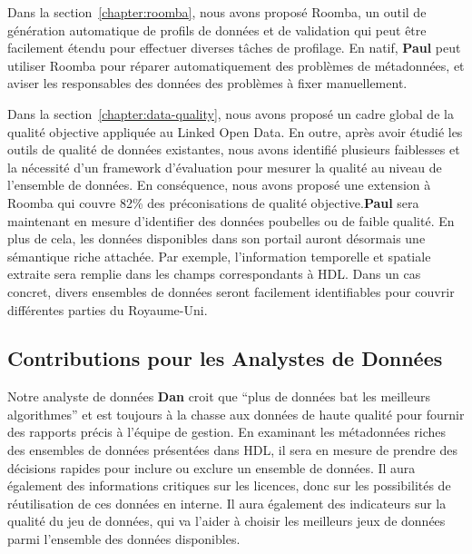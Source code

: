 Dans la section~\ref{chapter:roomba}, nous avons propos\'{e} Roomba, un outil de g\'{e}n\'{e}ration automatique de profils de donn\'{e}es et de validation qui peut \^{e}tre facilement \'{e}tendu pour effectuer diverses tâches de profilage. En natif, \textbf{Paul} peut utiliser Roomba pour r\'{e}parer automatiquement des probl\`{e}mes de m\'{e}tadonn\'{e}es, et aviser les responsables des donn\'{e}es des probl\`{e}mes \`{a} fixer manuellement.

Dans la section~\ref{chapter:data-quality}, nous avons propos\'{e} un cadre global de la qualit\'{e} objective appliqu\'{e}e au Linked Open Data. En outre, apr\`{e}s avoir \'{e}tudi\'{e} les outils de qualit\'{e} de donn\'{e}es existantes, nous avons identifi\'{e} plusieurs faiblesses et la n\'{e}cessit\'{e} d'un framework d'\'{e}valuation pour mesurer la qualit\'{e} au niveau de l'ensemble de donn\'{e}es. En cons\'{e}quence, nous avons propos\'{e} une extension \`{a} Roomba qui couvre 82\% des pr\'{e}conisations de qualit\'{e} objective.\textbf{Paul} sera maintenant en mesure d'identifier des donn\'{e}es poubelles ou de faible qualit\'{e}. En plus de cela, les donn\'{e}es disponibles dans son portail auront d\'{e}sormais une s\'{e}mantique riche attach\'{e}e. Par exemple, l'information temporelle et spatiale extraite sera remplie dans les champs correspondants \`{a} HDL. Dans un cas concret, divers ensembles de donn\'{e}es seront facilement identifiables pour couvrir diff\'{e}rentes parties du Royaume-Uni.

\subsection{Contributions pour les Analystes de Donn\'{e}es}

Notre analyste de donn\'{e}es \textbf{Dan} croit que ``plus de donn\'{e}es bat les meilleurs algorithmes'' et est toujours \`{a} la chasse aux donn\'{e}es de haute qualit\'{e} pour fournir des rapports pr\'{e}cis \`{a} l'\'{e}quipe de gestion. En examinant les m\'{e}tadonn\'{e}es riches des ensembles de donn\'{e}es pr\'{e}sent\'{e}es dans HDL, il sera en mesure de prendre des d\'{e}cisions rapides pour inclure ou exclure un ensemble de donn\'{e}es. Il aura \'{e}galement des informations critiques sur les licences, donc sur les possibilit\'{e}s de r\'{e}utilisation de ces donn\'{e}es en interne. Il aura \'{e}galement des indicateurs sur la qualit\'{e} du jeu de donn\'{e}es, qui va l'aider \`{a} choisir les meilleurs jeux de donn\'{e}es parmi l'ensemble des donn\'{e}es disponibles.

